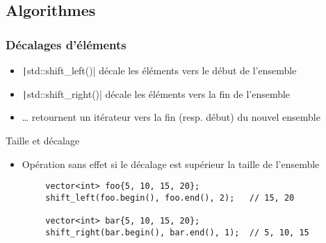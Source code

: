 \documentclass[C++.tex]{subfiles}
\begin{document}
\subsection*{Algorithmes}
\begin{frame}[fragile]
	\frametitle{Décalages d'éléments}
	\begin{itemize}
		\item \texttt|std::shift_left()| décale les éléments vers le début de l'ensemble
		\item \texttt|std::shift_right()| décale les éléments vers la fin de l'ensemble
		\item \ldots{} retournent un itérateur vers la fin (resp. début) du nouvel ensemble
	\end{itemize}

	\begin{block}{Taille et décalage}
		\begin{itemize}
			\item Opération sans effet si le décalage est supérieur la taille de l'ensemble
		\end{itemize}
	\end{block}

	\begin{verbatim}
		vector<int> foo{5, 10, 15, 20};
		shift_left(foo.begin(), foo.end(), 2);   // 15, 20

		vector<int> bar{5, 10, 15, 20};
		shift_right(bar.begin(), bar.end(), 1);  // 5, 10, 15
	\end{verbatim}


\end{frame}
\end{document}
